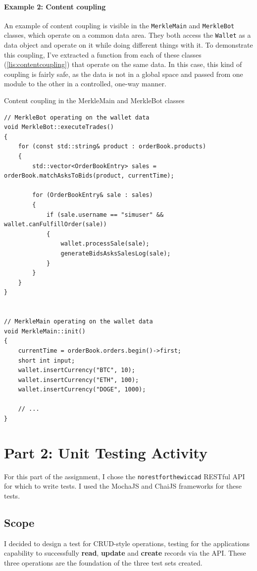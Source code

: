 \paragraph{Example 2: Content coupling} %
\label{par:example_2_content_coupling}
An example of content coupling is visible in the \texttt{MerkleMain} and \texttt{MerkleBot} classes, which operate on a common data area. They both access the \texttt{Wallet} as a data object and operate on it while doing different things with it. To demonstrate this coupling, I've extracted a function from each of these classes (\autoref{lis:contentcoupling}) that operate on the same data. In this case, this kind of coupling is fairly safe, as the data is not in a global space and passed from one module to the other in a controlled, one-way manner.
\begin{listing}[h]
	\caption{Content coupling in the MerkleMain and MerkleBot classes}
	\label{lis:contentcoupling}
	\begin{verbatim}
// MerkleBot operating on the wallet data
void MerkleBot::executeTrades()
{
	for (const std::string& product : orderBook.products)
	{
		std::vector<OrderBookEntry> sales = orderBook.matchAsksToBids(product, currentTime);

		for (OrderBookEntry& sale : sales)
		{
			if (sale.username == "simuser" && wallet.canFulfillOrder(sale))
			{
				wallet.processSale(sale);
				generateBidsAsksSalesLog(sale);
			}
		}
	}
}


// MerkleMain operating on the wallet data
void MerkleMain::init()
{
	currentTime = orderBook.orders.begin()->first;
	short int input;
	wallet.insertCurrency("BTC", 10);
	wallet.insertCurrency("ETH", 100);
	wallet.insertCurrency("DOGE", 1000);

	// ...
}
	\end{verbatim}
\end{listing}

\section{Part 2: Unit Testing Activity} %
\label{sec:part_2_unit_testing_activity}

For this part of the assignment, I chose the \texttt{norestforthewiccad} RESTful API for which to write tests. I used the MochaJS and ChaiJS frameworks for these tests. 

\subsection{Scope}
I decided to design a test for CRUD-style operations, testing for the applications capability to successfully \textbf{read}, \textbf{update} and \textbf{create} records via the API. These three operations are the foundation of the three test sets created.

